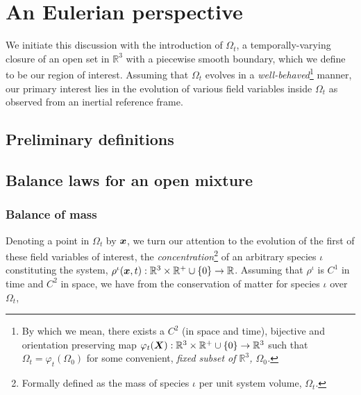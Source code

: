 \chapter{An Eulerian perspective}
\label{eulerian-perspective}

 We initiate this discussion with the introduction of $\Omega_{t}$, a
 temporally-varying closure of an open set in $\mathbb{R}^{3}$ with a
 piecewise smooth boundary, which we define to be our region of
 interest. Assuming that $\Omega_{t}$ evolves in a {\em
   well-behaved}\footnote{By which we mean, there exists a
   {\color{Blue} $\mathit{C}^{2}$} (in space and time), bijective
   and orientation preserving map $\varphi_{t}(\mbox{\boldmath$ X$}):
   \mathbb{R}^3\times\mathbb{R}^{+}\cup\{0\}
   \rightarrow\mathbb{R}^{3}$ such that $\Omega_{t} = \varphi_{t}
   (\Omega_{0})$ for some {\color{Sepia} convenient}, \em{fixed}
   subset of $\mathbb{R}^{3}$, $\Omega_{0}$.} manner, our primary
 interest lies in the evolution of various field variables inside
 $\Omega_{t}$ as observed from an inertial reference frame.

\section{Preliminary definitions}
\label{eu-preliminary-definitions}

\section{Balance laws for an open mixture}
\label{eu-balance-laws}
                                   
\subsection{Balance of mass}
\label{eu-balance-of-mass}

Denoting a point in $\Omega_{t}$ by $\mbox{\boldmath$ x$}$, we turn our attention to
the evolution of the first of these field variables of interest, the
{\em concentration}\footnote{Formally defined as the mass of species
  $\iota$ per unit system volume, $\Omega_{t}$.} of an arbitrary
species $\iota$ constituting the system, $\rho^{\iota}(\mbox{\boldmath$ x$},t):
\mathbb{R}^3\times\mathbb{R}^{+}\cup\{0\} \rightarrow
\mathbb{R}$. Assuming that $\rho^{\iota}$ is {\color{Blue}
  $\mathit{C}^{1}$} in time and {\color{Blue} $\mathit{C}^{2}$} in
space, we have from the conservation of matter for species $\iota$
over $\Omega_{t}$,


